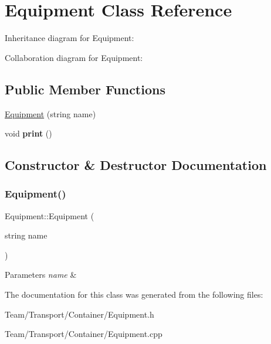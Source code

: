 \hypertarget{classEquipment}{}\section{Equipment Class Reference}
\label{classEquipment}


Inheritance diagram for Equipment\+:


Collaboration diagram for Equipment\+:
\subsection*{Public Member Functions}
\begin{DoxyCompactItemize}
\item 
\hyperlink{classEquipment_a40b66c38f62cee0ef51b7062d91946bf}{Equipment} (string name)
\item 
\mbox{\label{classEquipment_a78d184209461b59fe23dabe8f9325dfe}} 
void {\bfseries print} ()
\end{DoxyCompactItemize}


\subsection{Constructor \& Destructor Documentation}
\mbox{\label{classEquipment_a40b66c38f62cee0ef51b7062d91946bf}} 
\subsubsection{\texorpdfstring{Equipment()}{Equipment()}}
{\footnotesize\ttfamily Equipment\+::\+Equipment (\begin{DoxyParamCaption}\item[{string}]{name }\end{DoxyParamCaption})}


\begin{DoxyParams}{Parameters}
{\em name} & \\
\hline
\end{DoxyParams}


The documentation for this class was generated from the following files\+:\begin{DoxyCompactItemize}
\item 
Team/\+Transport/\+Container/Equipment.\+h\item 
Team/\+Transport/\+Container/Equipment.\+cpp\end{DoxyCompactItemize}
